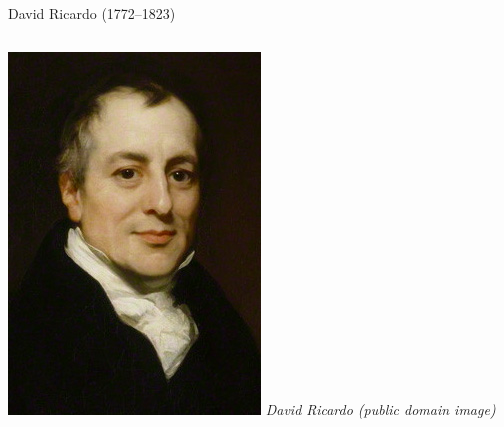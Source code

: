 \documentclass[notes,11pt, aspectratio=169, xcolor=table]{beamer}
\begin{document}
\begin{frame}{David Ricardo (1772–1823)}
\begin{columns}
    \begin{column}{0.35\textwidth}
        \centering
        \includegraphics[width=\linewidth]{figs/ricardo.jpg} %
        \vspace{0.2cm}
        \scriptsize\textit{David Ricardo (public domain image)}
    \end{column}
\end{columns}
\end{frame}
\end{document}
